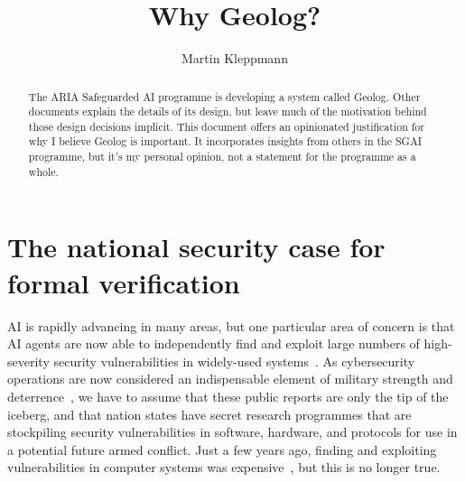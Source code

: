 \documentclass{article}
\title{Why Geolog?}
\author{Martin Kleppmann}
\begin{document}
\maketitle

\begin{abstract}
    The ARIA Safeguarded AI programme is developing a system called Geolog.
    Other documents explain the details of its design, but leave much of the motivation behind those design decisions implicit.
    This document offers an opinionated justification for why I believe Geolog is important.
    It incorporates insights from others in the SGAI programme, but it's my personal opinion, not a statement for the programme as a whole.
\end{abstract}



\section{The national security case for formal verification}

AI is rapidly advancing in many areas, but one particular area of concern is that AI agents are now able to independently find and exploit large numbers of high-severity security vulnerabilities in widely-used systems~\citep{firefox-vulnerabilities,anthropic-2026-mythos,ptacek-2026-vulnerabilities}.
As cybersecurity operations are now considered an indispensable element of military strength and deterrence~\citep{DoD-2023-cyber}, we have to assume that these public reports are only the tip of the iceberg, and that nation states have secret research programmes that are stockpiling security vulnerabilities in software, hardware, and protocols for use in a potential future armed conflict.
Just a few years ago, finding and exploiting vulnerabilities in computer systems was expensive~\citep{slayton-2017-cyber}, but this is no longer true.
\end{document}
